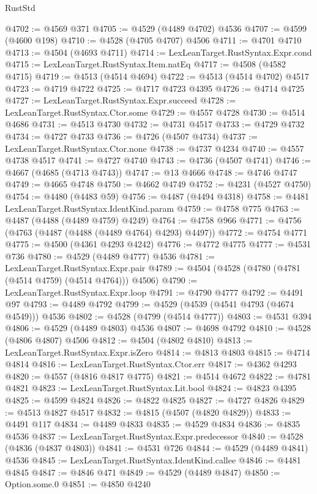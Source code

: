 \begin{lexlean}{RustStd}
\begin{coremodule}
@4702 := @4569 @371
@4705 := @4529 (@4489 @4702) @4536
@4707 := @4599 (@4600 @198)
@4710 := @4528 (@4705 @4707) @4506
@4711 := @4701 @4710
@4713 := @4504 (@4693 @4711)
@4714 := LexLeanTarget.RustSyntax.Expr.cond
@4715 := LexLeanTarget.RustSyntax.Item.natEq
@4717 := @4508 (@4582 @4715)
@4719 := @4513 (@4514 @4694)
@4722 := @4513 (@4514 @4702) @4517
@4723 := @4719 @4722
@4725 := @4717 @4723 @4395
@4726 := @4714 @4725
@4727 := LexLeanTarget.RustSyntax.Expr.succeed
@4728 := LexLeanTarget.RustSyntax.Ctor.some
@4729 := @4557 @4728
@4730 := @4514 @4686
@4731 := @4513 @4730
@4732 := @4731 @4517
@4733 := @4729 @4732
@4734 := @4727 @4733
@4736 := @4726 (@4507 @4734)
@4737 := LexLeanTarget.RustSyntax.Ctor.none
@4738 := @4737 @4234
@4740 := @4557 @4738 @4517
@4741 := @4727 @4740
@4743 := @4736 (@4507 @4741)
@4746 := @4667 (@4685 (@4713 @4743))
@4747 := @13 @4666
@4748 := @4746 @4747
@4749 := @4665 @4748
@4750 := @4662 @4749
@4752 := @4231 (@4527 @4750)
@4754 := @4480 (@4483 @59)
@4756 := @4487 (@4494 @4318)
@4758 := @4481 LexLeanTarget.RustSyntax.IdentKind.param
@4759 := @4758 @775
@4763 := @4487 (@4488 (@4489 @4759) @4249)
@4764 := @4758 @966
@4771 := @4756 (@4763 (@4487 (@4488 (@4489 @4764) @4293) @4497))
@4772 := @4754 @4771
@4775 := @4500 (@4361 @4293 @4242)
@4776 := @4772 @4775
@4777 := @4531 @736
@4780 := @4529 (@4489 @4777) @4536
@4781 := LexLeanTarget.RustSyntax.Expr.pair
@4789 := @4504 (@4528 (@4780 (@4781 (@4514 @4759) (@4514 @4764))) @4506)
@4790 := LexLeanTarget.RustSyntax.Expr.loop
@4791 := @4790 @4777
@4792 := @4491 @97
@4793 := @4489 @4792
@4799 := @4529 (@4539 (@4541 @4793 (@4674 @4549))) @4536
@4802 := @4528 (@4799 (@4514 @4777))
@4803 := @4531 @394
@4806 := @4529 (@4489 @4803) @4536
@4807 := @4698 @4792
@4810 := @4528 (@4806 @4807) @4506
@4812 := @4504 (@4802 @4810)
@4813 := LexLeanTarget.RustSyntax.Expr.isZero
@4814 := @4813 @4803
@4815 := @4714 @4814
@4816 := LexLeanTarget.RustSyntax.Ctor.err
@4817 := @4362 @4293
@4820 := @4557 (@4816 @4817 @4775)
@4821 := @4514 @4672
@4822 := @4781 @4821
@4823 := LexLeanTarget.RustSyntax.Lit.bool
@4824 := @4823 @4395
@4825 := @4599 @4824
@4826 := @4822 @4825
@4827 := @4727 @4826
@4829 := @4513 @4827 @4517
@4832 := @4815 (@4507 (@4820 @4829))
@4833 := @4491 @117
@4834 := @4489 @4833
@4835 := @4529 @4834
@4836 := @4835 @4536
@4837 := LexLeanTarget.RustSyntax.Expr.predecessor
@4840 := @4528 (@4836 (@4837 @4803))
@4841 := @4531 @726
@4844 := @4529 (@4489 @4841) @4536
@4845 := LexLeanTarget.RustSyntax.IdentKind.callee
@4846 := @4481 @4845
@4847 := @4846 @471
@4849 := @4529 (@4489 @4847)
@4850 := Option.some.{0}
@4851 := @4850 @4240

\end{coremodule}
\end{lexlean}
